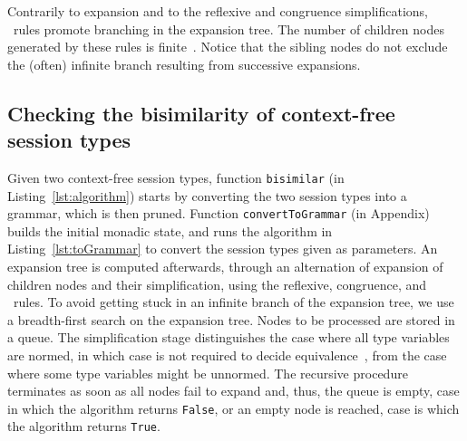 Contrarily to expansion and to the reflexive and congruence
simplifications, \BPA\ rules promote branching in the expansion
tree. The number of children nodes generated by these rules is
finite~\cite{DBLP:journals/iandc/ChristensenHS95}.
%
Notice that the sibling nodes do not exclude the (often) infinite
branch resulting from successive expansions.

\subsection{Checking the bisimilarity of context-free session types}


Given two context-free session types, function \lstinline|bisimilar|
(in Listing~\ref{lst:algorithm}) starts by converting the two session
types into a grammar, which is then pruned. Function
\lstinline|convertToGrammar| (in Appendix) builds the initial monadic
state, and runs the algorithm in Listing~\ref{lst:toGrammar} to
convert the session types given as parameters.
%
An expansion tree is computed afterwards, through an alternation of
expansion of children nodes and their simplification, using the
reflexive, congruence, and \BPA\ rules.
%
To avoid getting stuck in an infinite branch of the expansion tree, we
use a breadth-first search on the expansion tree. Nodes to be processed 
are stored in a queue.
%
The simplification stage distinguishes the case where all type
variables are normed, in which case  is not required to decide
equivalence~\cite{caucal1986decidabilite,DBLP:journals/iandc/ChristensenHS95},
from the case where some type variables might be unnormed. The
recursive procedure terminates as soon as all nodes fail to expand
and, thus, the queue is empty, case in which the algorithm returns
\lstinline|False|, or an empty node is reached, case is which the
algorithm returns \lstinline|True|.

